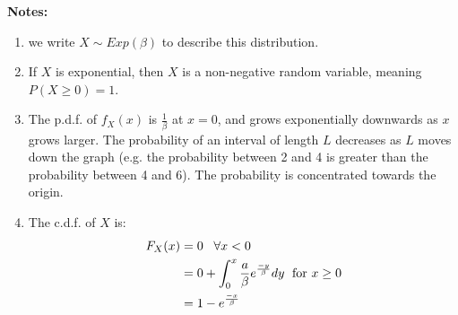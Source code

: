 \documentclass[12pt]{article}
\begin{document}
\textbf{Notes:}
\begin{enumerate}
    \item we write $X \sim Exp(\beta)$ to describe this distribution.
    \item If $X$ is exponential, then $X$ is a non-negative random variable, meaning $P(X \geq 0) = 1$.
    \item The p.d.f. of $f_X (x)$ is $\frac{1}{\beta}$ at $x=0$, and grows exponentially downwards as $x$ grows larger. The probability of an interval of length $L$ decreases as $L$ moves down the graph (e.g. the probability between 2 and 4 is greater than the probability between 4 and 6). The probability is concentrated towards the origin.
    \item The c.d.f. of $X$ is:
        \begin{align*}
            F_X (x) &= 0 \; \; \; \forall x < 0 \\
                &= 0 + \int_0^x \frac{a}{\beta} e^{\frac{-y}{\beta}} dy \; \textnormal{ for } x \geq 0 \\
                &= 1 - e^{\frac{-x}{\beta}}
        \end{align*}


\end{enumerate}
\end{document}
